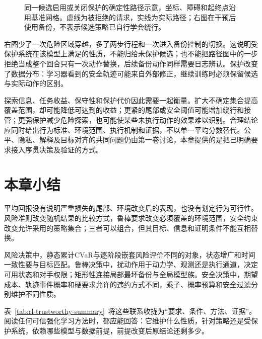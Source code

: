 \begin{figure}[htbp]
  \centering
  
  \caption{同一候选启用或关闭保护的确定性路径示意，坐标、障碍和起终点沿用基准网格。虚线为被拒绝的请求，实线为实际路径；右图在干预后使用备份，不表示候选策略已自行学会绕行。}
  \label{fig:rl-trustworthy-protected-path}
\end{figure}

右图少了一次危险区域穿越，多了两步行程和一次进入备份控制的切换。这说明受保护系统在该模型上满足的性质，不能归给未保护候选；也不能把路径图中的一步拒绝当成整个回合只有一次动作替换，后续备份动作同样需要日志辨认。保护改变了数据分布：学习器看到的安全轨迹可能来自外部修正，继续训练时必须保留候选与实际动作的区别。

探索信息、任务收益、保守性和保护代价因此需要一起衡量。扩大不确定集合提高覆盖范围，却可能降低可达到的收益；更紧的尾部或安全阈值可能增加绕行和接管；更强保护减少危险探索，也可能使某些未执行动作的效果难以识别。合理结论应同时给出行为标准、环境范围、执行机制和证据，不以单一平均分数替代。公平、隐私、解释及目标对齐的共同问题仍由第一卷讨论，本章提供的是把已明确要求接入序贯决策及验证的方式。

\section{本章小结}
\label{sec:rl-trustworthy-summary}

平均回报没有说明严重损失的尾部、环境改变后的表现，也没有划定行为可行性。风险准则改变随机结果的比较方式，鲁棒要求改变必须覆盖的环境范围，安全约束改变允许采用的策略集合；三者可以组合，但其目标、信息和证明条件不能互相替换。

风险决策中，静态累计CVaR与逐阶段嵌套风险评价不同的对象，状态增广和时间一致性要与目标匹配。鲁棒决策中，扰动作用于动力学、观测还是执行通道，决定可用状态和对手权限；矩形性连接局部最坏备份与全局模型族。安全决策中，期望成本、轨迹事件概率和硬要求允许的违约方式不同，乘子、概率预算和安全过滤分别维护不同性质。

表~\ref{tab:rl-trustworthy-summary}~将这些联系收拢为“要求、条件、方法、证据”。阅读任何可信强化学习方法时，都应能回答：它维护什么性质，针对策略还是受保护系统，依赖哪些模型与数据前提，前提改变后原结论还剩多少。

